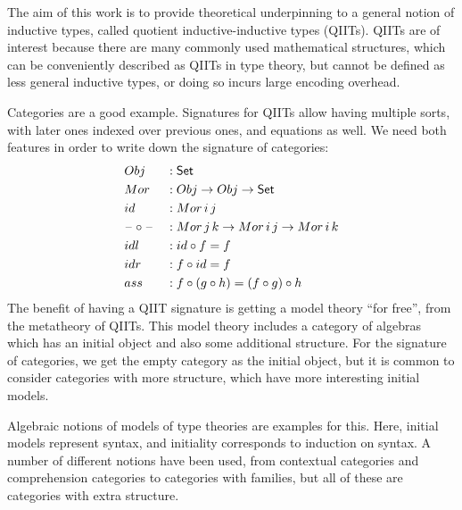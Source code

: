 \documentclass{llncs}
\newcommand{\Kfam}{\mathsf{K}}
\begin{document}



The aim of this work is to provide theoretical underpinning to a general notion
of inductive types, called quotient inductive-inductive types (QIITs). QIITs are
of interest because there are many commonly used mathematical structures, which
can be conveniently described as QIITs in type theory, but cannot be defined as
less general inductive types, or doing so incurs large encoding overhead.

Categories are a good example. Signatures for QIITs allow having multiple sorts,
with later ones indexed over previous ones, and equations as well. We need both
features in order to write down the signature of categories:
\begin{alignat*}{3}
  & Obj && : \mathsf{Set} \\
  & Mor && : Obj \rightarrow Obj \rightarrow \mathsf{Set} \\
  & id  && : Mor\,i\,j \\
  & \mathord{\hspace{1pt}\text{--}\hspace{1pt}}\circ\mathord{\hspace{1pt}\text{--}\hspace{1pt}} && : Mor\,j\,k\rightarrow Mor\,i\,j \rightarrow Mor\,i\,k \\
  & idl && : id \circ f = f \\
  & idr && : f \circ id = f \\
  & ass && : f \circ (g \circ h) = (f \circ g) \circ h
\end{alignat*}
The benefit of having a QIIT signature is getting a model theory ``for free'',
from the metatheory of QIITs. This model theory includes a category of algebras
which has an initial object and also some additional structure. For the
signature of categories, we get the empty category as the initial object, but it
is common to consider categories with more structure, which have more
interesting initial models.

Algebraic notions of models of type theories are examples for this. Here,
initial models represent syntax, and initiality corresponds to induction on
syntax. A number of different notions have been used, from contextual categories
and comprehension categories to categories with families, but all of these are
categories with extra structure.
\end{document}
